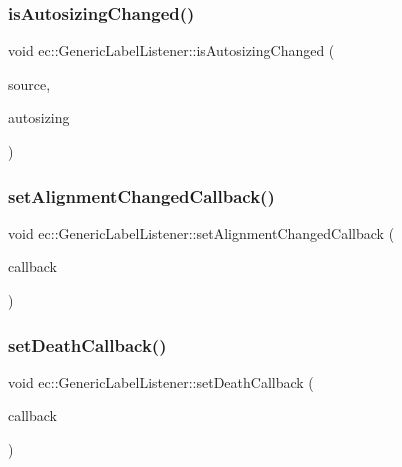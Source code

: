 \subsubsection{\texorpdfstring{is\+Autosizing\+Changed()}{isAutosizingChanged()}}
{\footnotesize\ttfamily void ec\+::\+Generic\+Label\+Listener\+::is\+Autosizing\+Changed (\begin{DoxyParamCaption}\item[{agui\+::\+Label $\ast$}]{source,  }\item[{bool}]{autosizing }\end{DoxyParamCaption})\hspace{0.3cm}{\ttfamily [override]}}

\mbox{\label{classec_1_1_generic_label_listener_a02e2fc85023744de2891a53058bb229b}} 
\subsubsection{\texorpdfstring{set\+Alignment\+Changed\+Callback()}{setAlignmentChangedCallback()}}
{\footnotesize\ttfamily void ec\+::\+Generic\+Label\+Listener\+::set\+Alignment\+Changed\+Callback (\begin{DoxyParamCaption}\item[{const \mbox{\hyperlink{classec_1_1_generic_label_listener_af470c076b7748036de36bc1d99bce445}{Alignment\+Changed\+\_\+\+Callback}} \&}]{callback }\end{DoxyParamCaption})}

\mbox{\label{classec_1_1_generic_label_listener_abf6b7abe8b5aab4c772d6e4b1cd0baaf}} 
\subsubsection{\texorpdfstring{set\+Death\+Callback()}{setDeathCallback()}}
{\footnotesize\ttfamily void ec\+::\+Generic\+Label\+Listener\+::set\+Death\+Callback (\begin{DoxyParamCaption}\item[{const \mbox{\hyperlink{classec_1_1_generic_label_listener_af79a68f4cb5c696fa1d921e7441d93eb}{Death\+\_\+\+Callback}} \&}]{callback }\end{DoxyParamCaption})}

